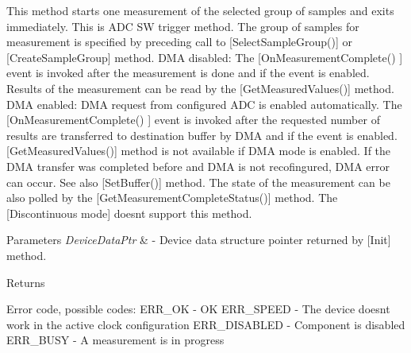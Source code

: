 This method starts one measurement of the selected group of samples and exits immediately. This is A\+DC SW trigger method. The group of samples for measurement is specified by preceding call to \mbox{[}Select\+Sample\+Group()\mbox{]} or \mbox{[}Create\+Sample\+Group\mbox{]} method. D\+MA disabled\+: The \mbox{[}On\+Measurement\+Complete() \mbox{]} event is invoked after the measurement is done and if the event is enabled. Results of the measurement can be read by the \mbox{[}Get\+Measured\+Values()\mbox{]} method. D\+MA enabled\+: D\+MA request from configured A\+DC is enabled automatically. The \mbox{[}On\+Measurement\+Complete() \mbox{]} event is invoked after the requested number of results are transferred to destination buffer by D\+MA and if the event is enabled. \mbox{[}Get\+Measured\+Values()\mbox{]} method is not available if D\+MA mode is enabled. If the D\+MA transfer was completed before and D\+MA is not recofingured, D\+MA error can occur. See also \mbox{[}Set\+Buffer()\mbox{]} method. The state of the measurement can be also polled by the \mbox{[}Get\+Measurement\+Complete\+Status()\mbox{]} method. The \mbox{[}Discontinuous mode\mbox{]} doesn\textquotesingle{}t support this method. 


\begin{DoxyParams}{Parameters}
{\em Device\+Data\+Ptr} & -\/ Device data structure pointer returned by \mbox{[}Init\mbox{]} method. \\
\hline
\end{DoxyParams}
\begin{DoxyReturn}{Returns}

\begin{DoxyItemize}
\item Error code, possible codes\+: E\+R\+R\+\_\+\+OK -\/ OK E\+R\+R\+\_\+\+S\+P\+E\+ED -\/ The device doesn\textquotesingle{}t work in the active clock configuration E\+R\+R\+\_\+\+D\+I\+S\+A\+B\+L\+ED -\/ Component is disabled E\+R\+R\+\_\+\+B\+U\+SY -\/ A measurement is in progress 
\end{DoxyItemize}
\end{DoxyReturn}
